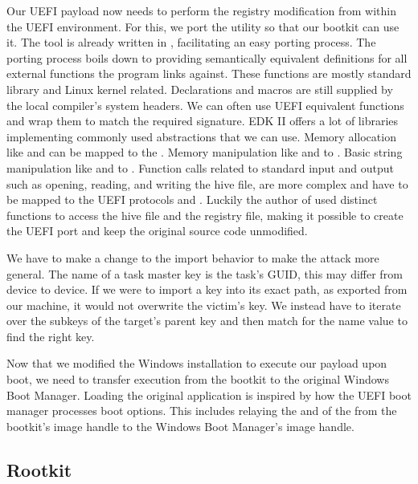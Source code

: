 Our \ac{UEFI} payload now needs to perform the registry modification from within the \ac{UEFI} environment.
For this, we port the  utility so that our bootkit can use it.
The tool is already written in , facilitating an easy porting process.
The porting process boils down to providing semantically equivalent definitions for all external functions the program links against.
These functions are mostly  standard library and Linux kernel related.
Declarations and macros are still supplied by the local compiler's system headers.
We can often use \ac{UEFI} equivalent functions and wrap them to match the required signature.
\ac{EDK} II offers a lot of libraries implementing commonly used abstractions that we can use.
Memory allocation like  and  can be mapped to the .
Memory manipulation like  and  to .
Basic string manipulation like  and  to .
Function calls related to standard input and output such as opening, reading, and writing the hive file, are more complex and have to be mapped to the \ac{UEFI} protocols  and .
Luckily the author of  used distinct functions to access the hive file and the registry file, making it possible to create the \ac{UEFI} port and keep the original source code unmodified.

We have to make a change to the import behavior to make the attack more general.
The name of a task master key is the task's \ac{GUID}, this may differ from device to device.
If we were to import a key into its exact path, as exported from our machine, it would not overwrite the victim's  key.
We instead have to iterate over the subkeys of the target's parent key and then match for the name value to find the right key.

Now that we modified the Windows installation to execute our payload upon boot, we need to transfer execution from the bootkit to the original Windows Boot Manager.
Loading the original application is inspired by how the \ac{UEFI} boot manager processes boot options.
This includes relaying the  and  of the  from the bootkit's image handle to the Windows Boot Manager's image handle.

\subsection{Rootkit}

